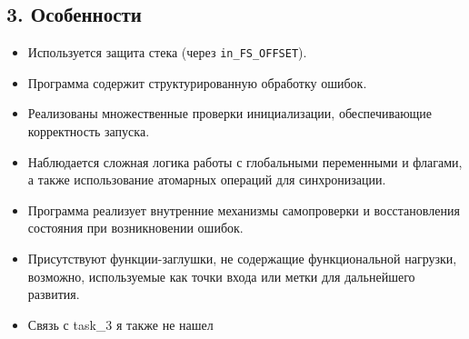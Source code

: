 \subsection*{3. Особенности}

\begin{itemize}

    \item Используется защита стека (через \texttt{in\_FS\_OFFSET}).
    \item Программа содержит структурированную обработку ошибок.
    \item Реализованы множественные проверки инициализации, обеспечивающие корректность запуска.
    \item Наблюдается сложная логика работы с глобальными переменными и флагами, а также использование атомарных операций для синхронизации.
    \item Программа реализует внутренние механизмы самопроверки и восстановления состояния при возникновении ошибок.
    \item Присутствуют функции-заглушки, не содержащие функциональной нагрузки, возможно,
    используемые как точки входа или метки для дальнейшего развития.
    \item Связь с task\_3 я также не нашел
\end{itemize}
